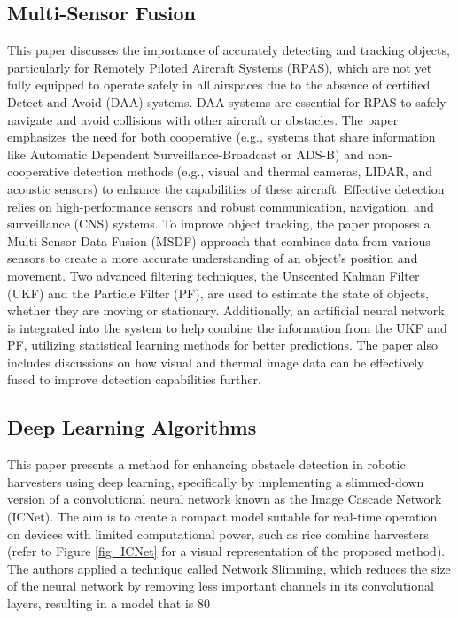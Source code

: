 \documentclass[12pt,twocolumn]{article}
\begin{document}
\subsection{Multi-Sensor Fusion}

This paper discusses the importance of accurately detecting and tracking objects, particularly for Remotely Piloted Aircraft Systems (RPAS), which are not yet fully equipped to operate safely in all airspaces due to the absence of certified Detect-and-Avoid (DAA) systems. DAA systems are essential for RPAS to safely navigate and avoid collisions with other aircraft or obstacles. The paper emphasizes the need for both cooperative (e.g., systems that share information like Automatic Dependent Surveillance-Broadcast or ADS-B) and non-cooperative detection methods (e.g., visual and thermal cameras, LIDAR, and acoustic sensors) to enhance the capabilities of these aircraft. Effective detection relies on high-performance sensors and robust communication, navigation, and surveillance (CNS) systems.
To improve object tracking, the paper proposes a Multi-Sensor Data Fusion (MSDF) approach that combines data from various sensors to create a more accurate understanding of an object's position and movement. Two advanced filtering techniques, the Unscented Kalman Filter (UKF) and the Particle Filter (PF), are used to estimate the state of objects, whether they are moving or stationary. Additionally, an artificial neural network is integrated into the system to help combine the information from the UKF and PF, utilizing statistical learning methods for better predictions. The paper also includes discussions on how visual and thermal image data can be effectively fused to improve detection capabilities further.

\subsection{Deep Learning Algorithms}

This paper presents a method for enhancing obstacle detection in robotic harvesters using deep learning, specifically by implementing a slimmed-down version of a convolutional neural network known as the Image Cascade Network (ICNet). The aim is to create a compact model suitable for real-time operation on devices with limited computational power, such as rice combine harvesters (refer to Figure \ref{fig_ICNet} for a visual representation of the proposed method). The authors applied a technique called Network Slimming, which reduces the size of the neural network by removing less important channels in its convolutional layers, resulting in a model that is 80%
\end{document}
